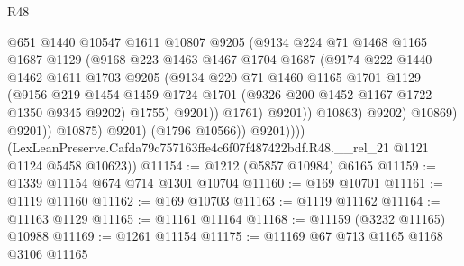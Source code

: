\begin{lexlean}{R48}
\begin{coremodule}
                                @651
                                @1440
                                @10547
                                @1611
                                @10807
                                @9205
                                (@9134
                                  @224
                                  @71
                                  @1468
                                  @1165
                                  @1687
                                  @1129
                                  (@9168
                                    @223
                                    @1463
                                    @1467
                                    @1704
                                    @1687
                                    (@9174
                                      @222
                                      @1440
                                      @1462
                                      @1611
                                      @1703
                                      @9205
                                      (@9134
                                        @220
                                        @71
                                        @1460
                                        @1165
                                        @1701
                                        @1129
                                        (@9156
                                          @219
                                          @1454
                                          @1459
                                          @1724
                                          @1701
                                          (@9326 @200 @1452 @1167 @1722 @1350 @9345 @9202)
                                          @1755)
                                        @9201))
                                    @1761)
                                  @9201))
                              @10863)
                            @9202)
                          @10869)
                        @9201))
                    @10875)
                  @9201)
                (@1796 @10566))
              @9201))))
      (LexLeanPreserve.Cafda79c757163ffe4c6f07f487422bdf.R48.__rel_21 @1121 @1124 @5458 @10623))
@11154 := @1212 (@5857 @10984) @6165
@11159 := @1339 @11154 @674 @714 @1301 @10704
@11160 := @169 @10701
@11161 := @1119 @11160
@11162 := @169 @10703
@11163 := @1119 @11162
@11164 := @11163 @1129
@11165 := @11161 @11164
@11168 := @11159 (@3232 @11165) @10988
@11169 := @1261 @11154
@11175 := @11169 @67 @713 @1165 @1168 @3106 @11165

\end{coremodule}
\end{lexlean}
